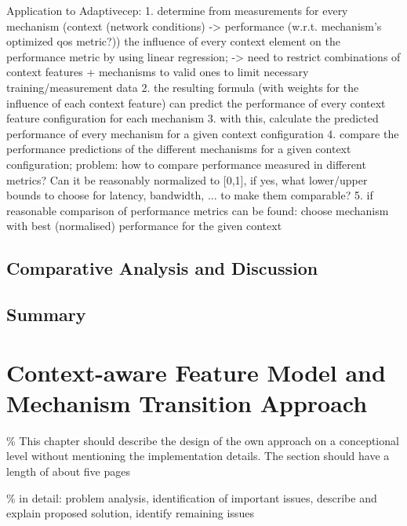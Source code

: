  Application to Adaptive\gls{cep}: 
 1. determine from measurements for every mechanism (context (network conditions) -> performance (w.r.t. mechanism's optimized \gls{qos} metric?)) the influence of every context element on the performance metric by using linear regression; -> need to restrict combinations of context features + mechanisms to valid ones to limit necessary training/measurement data 
 2. the resulting formula (with weights for the influence of each context feature) can predict the performance of every context feature configuration for each mechanism 
 3. with this, calculate the predicted performance of every mechanism for a given context configuration
 4. compare the performance predictions of the different mechanisms for a given context configuration; problem: how to compare performance measured in different metrics? Can it be reasonably normalized to [0,1], if yes, what lower/upper bounds to choose for latency, bandwidth, ... to make them comparable?
 5. if reasonable comparison of performance metrics can be found: choose mechanism with best (normalised) performance for the given context
\section{Comparative Analysis and Discussion} 
\section{Summary}

\chapter{Context-aware Feature Model and Mechanism Transition Approach}

\% This chapter should describe the design of the own approach on a con\gls{cep}tional level without mentioning the implementation details. The section should have a length of about five pages

\% in detail: problem analysis, identification of important issues, describe and explain proposed solution, identify remaining issues

